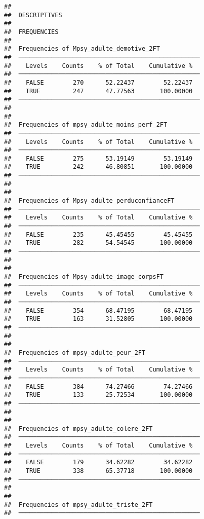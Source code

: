 \documentclass[
]{article}
\begin{document}
\begin{verbatim}
## 
##  DESCRIPTIVES
## 
##  FREQUENCIES
## 
##  Frequencies of Mpsy_adulte_demotive_2FT            
##  ────────────────────────────────────────────────── 
##    Levels    Counts    % of Total    Cumulative %   
##  ────────────────────────────────────────────────── 
##    FALSE        270      52.22437        52.22437   
##    TRUE         247      47.77563       100.00000   
##  ────────────────────────────────────────────────── 
## 
## 
##  Frequencies of mpsy_adulte_moins_perf_2FT          
##  ────────────────────────────────────────────────── 
##    Levels    Counts    % of Total    Cumulative %   
##  ────────────────────────────────────────────────── 
##    FALSE        275      53.19149        53.19149   
##    TRUE         242      46.80851       100.00000   
##  ────────────────────────────────────────────────── 
## 
## 
##  Frequencies of Mpsy_adulte_perduconfianceFT        
##  ────────────────────────────────────────────────── 
##    Levels    Counts    % of Total    Cumulative %   
##  ────────────────────────────────────────────────── 
##    FALSE        235      45.45455        45.45455   
##    TRUE         282      54.54545       100.00000   
##  ────────────────────────────────────────────────── 
## 
## 
##  Frequencies of Mpsy_adulte_image_corpsFT           
##  ────────────────────────────────────────────────── 
##    Levels    Counts    % of Total    Cumulative %   
##  ────────────────────────────────────────────────── 
##    FALSE        354      68.47195        68.47195   
##    TRUE         163      31.52805       100.00000   
##  ────────────────────────────────────────────────── 
## 
## 
##  Frequencies of mpsy_adulte_peur_2FT                
##  ────────────────────────────────────────────────── 
##    Levels    Counts    % of Total    Cumulative %   
##  ────────────────────────────────────────────────── 
##    FALSE        384      74.27466        74.27466   
##    TRUE         133      25.72534       100.00000   
##  ────────────────────────────────────────────────── 
## 
## 
##  Frequencies of mpsy_adulte_colere_2FT              
##  ────────────────────────────────────────────────── 
##    Levels    Counts    % of Total    Cumulative %   
##  ────────────────────────────────────────────────── 
##    FALSE        179      34.62282        34.62282   
##    TRUE         338      65.37718       100.00000   
##  ────────────────────────────────────────────────── 
## 
## 
##  Frequencies of mpsy_adulte_triste_2FT              
##  ────────────────────────────────────────────────── 

\end{verbatim}
\end{document}
